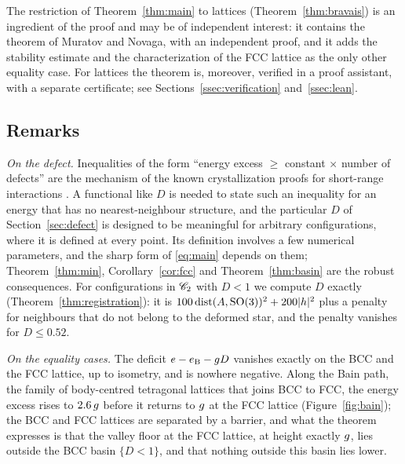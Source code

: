 The restriction of Theorem~\ref{thm:main} to lattices (Theorem~\ref{thm:bravais}) is an ingredient of the proof and may be of
independent interest: it contains the theorem of Muratov and Novaga, with an independent proof, and it adds the stability estimate
and the characterization of the FCC lattice as the only other equality case. For lattices the theorem is, moreover, verified in a
proof assistant, with a separate certificate; see Sections~\ref{ssec:verification} and~\ref{ssec:lean}.

\subsection{Remarks}

\emph{On the defect.} Inequalities of the form ``energy excess $\ge$ constant $\times$ number of defects'' are the mechanism of the
known crystallization proofs for short-range interactions \cite{Theil2006,FlatleyTheil2015}. A functional like $D$ is needed to state
such an inequality for an energy that has no nearest-neighbour structure, and the particular $D$ of Section~\ref{sec:defect} is
designed to be meaningful for arbitrary configurations, where it is defined at every point. Its definition involves a few numerical
parameters, and the sharp form of \eqref{eq:main} depends on them; Theorem~\ref{thm:min}, Corollary~\ref{cor:fcc} and
Theorem~\ref{thm:basin} are the robust consequences. For configurations in $\mathscr C_2$ with $D<1$ we compute $D$ exactly
(Theorem~\ref{thm:registration}): it is $100\operatorname{dist}(A,\mathrm{SO}(3))^2+200|h|^2$ plus a penalty for neighbours that do not belong to the
deformed star, and the penalty vanishes for $D\le0.52$.

\emph{On the equality cases.} The deficit $e-e_{\mathrm B}-g D$ vanishes exactly on the BCC and the FCC lattice, up to isometry, and is
nowhere negative. Along the Bain path, the family of body-centred tetragonal lattices that joins BCC to FCC, the energy excess rises
to $2.6\,g$ before it returns to $g$ at the FCC lattice (Figure~\ref{fig:bain}); the BCC and FCC lattices are separated by a
barrier, and what the theorem expresses is that the valley floor at the FCC lattice, at height exactly $g$, lies outside the BCC
basin $\{D<1\}$, and that nothing outside this basin lies lower.

